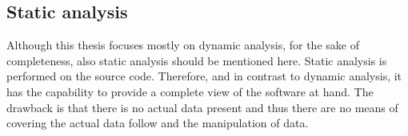 \begin{comment}
\hl{TODO einfach weglassen? I will distinct here between two categories of dynamic analysis:}
\hl{TODO... ???}
\begin{itemize}
\item interactive\\
	The characteristics of interactive(stepped debugging, interpretative execution) approaches, is that the program is still executing during the analysis and thus time is a critical factor. This makes some analysis methods like performance analysis impossible. In networked environment, timeouts can make interactive analysis very hard.
\item non interactive(real-time and post-mortem)\\
	In real-time analysis(log analysis, trace analysis), data changes very quickly, which can make the task of tracking execution scenarios very resource intensive. In contrast, in post-mortem analysis(log analysis, trace analysis), the processing of very large files becomes a problem.
\end{itemize}


\begin{itemize}
\item \hl{INTEGRATE THIS?: observer effect} \\
Andrews, J. (1997). Testing using log file analysis: tools, methods, and issues.
In Proc. International Conference on Automated Software Engineering (ASE), pages 157–
166. IEEE Computer Society Press
\item scalability \\
Zaidman, A. (2006). Scalability Solutions for Program Comprehension through Dynamic
Analysis. PhD thesis, University of Antwerp
\item debugging -> different kind of paradigms and languages and tools\\
see @incollection{reiss1993trace,
title={Trace-based debugging},
author={Reiss, Steven P},
booktitle={Automated and Algorithmic Debugging},
pages={305--314},
year={1993},
publisher={Springer}
}
\end{itemize}
\end{comment}

\subsection{Static analysis}

Although this thesis focuses mostly on dynamic analysis, for the sake of completeness, also static analysis should be mentioned here.
Static analysis is performed on the source code. Therefore, and in contrast to dynamic analysis, it has the capability to provide a complete view of the software at hand. The drawback is that there is no actual data present and thus there are no means of covering the actual data follow and the manipulation of data.

